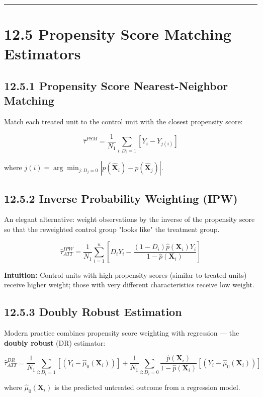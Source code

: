 \medskip\hrule\medskip

\section{12.5 Propensity Score Matching Estimators}

\subsection{12.5.1 Propensity Score Nearest-Neighbor Matching}

Match each treated unit to the control unit with the closest propensity score:

\[
\hat{\tau}^{PSM} = \frac{1}{N_1}\sum_{i: D_i=1}\left[Y_i - Y_{j(i)}\right]
\]

where $j(i) = \arg\min_{j: D_j = 0} |p(\hat{\mathbf{X}}_i) - p(\hat{\mathbf{X}}_j)|$.

\subsection{12.5.2 Inverse Probability Weighting (IPW)}

An elegant alternative: weight observations by the inverse of the propensity score so that the reweighted control group "looks like" the treatment group.

\[
\hat{\tau}^{IPW}_{ATT} = \frac{1}{N_1}\sum_{i=1}^n\left[D_i Y_i - \frac{(1-D_i)\hat{p}(\mathbf{X}_i)Y_i}{1-\hat{p}(\mathbf{X}_i)}\right]
\]

\textbf{Intuition:} Control units with high propensity scores (similar to treated units) receive higher weight; those with very different characteristics receive low weight.

\subsection{12.5.3 Doubly Robust Estimation}

Modern practice combines propensity score weighting with regression --- the \textbf{doubly robust} (DR) estimator:

\[
\hat{\tau}^{DR}_{ATT} = \frac{1}{N_1}\sum_{i: D_i=1}\left[(Y_i - \hat{\mu}_0(\mathbf{X}_i))\right] + \frac{1}{N_1}\sum_{i: D_i=0}\frac{\hat{p}(\mathbf{X}_i)}{1-\hat{p}(\mathbf{X}_i)}\left[(Y_i - \hat{\mu}_0(\mathbf{X}_i))\right]
\]

where $\hat{\mu}_0(\mathbf{X}_i)$ is the predicted untreated outcome from a regression model.

